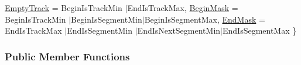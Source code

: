 \begin{DoxyCompactItemize}
\newline
\mbox{\hyperlink{classKite_1_1Track_af4bdc8469c0fee386fc2ff30e0666bcaaa697b71e325cea0980e9555654f8f3cf}{Empty\+Track}} = Begin\+Is\+Track\+Min $\vert$\+End\+Is\+Track\+Max, 
\newline
\mbox{\hyperlink{classKite_1_1Track_af4bdc8469c0fee386fc2ff30e0666bcaa8621fa6a5b7a491fd1bf8dd7f0dd3589}{Begin\+Mask}} = Begin\+Is\+Track\+Min $\vert$\+Begin\+Is\+Segment\+Min$\vert$\+Begin\+Is\+Segment\+Max, 
\newline
\mbox{\hyperlink{classKite_1_1Track_af4bdc8469c0fee386fc2ff30e0666bcaa0b5a81972d3a6718c3d68199467d2d11}{End\+Mask}} = End\+Is\+Track\+Max $\vert$\+End\+Is\+Segment\+Min $\vert$\+End\+Is\+Next\+Segment\+Min$\vert$\+End\+Is\+Segment\+Max
 \}
\end{DoxyCompactItemize}
\subsubsection*{Public Member Functions}

